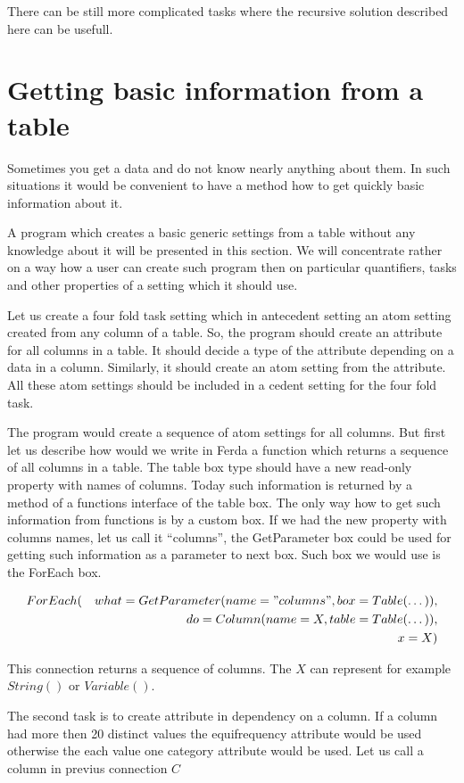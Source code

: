 \documentclass[a4paper,12pt]{book}
\begin{document}
There can be still more complicated tasks where the recursive solution described here can be usefull. 

\section{Getting basic information from a table}
Sometimes you get a data and do not know nearly anything about them. In such situations it would be convenient to have a method how to get quickly basic information about it.

A program which creates a basic generic settings from a table without any knowledge about it will be presented in this section. We will concentrate rather on a way how a user can create such program then on particular quantifiers, tasks and other properties of a setting which it should use.

Let us create a four fold task setting which in antecedent setting an atom setting created from any column of a table. So, the program should create an attribute for all columns in a table. It should decide a type of the attribute depending on a data in a column. Similarly, it should create an atom setting from the attribute. All these atom settings should be included in a cedent setting for the four fold task.

The program would create a sequence of atom settings for all columns. But first let us describe how would we write in Ferda a function which returns a sequence of all columns in a table. The table box type should have a new read-only property with names of columns. Today such information is returned by a method of a functions interface of the table box. The only way how to get such information from functions is by a custom box. If we had the new property with columns names, let us call it ``columns'', the GetParameter box could be used for getting such information as a parameter to next box. Such box we would use is the ForEach box.

\begin{eqnarray*}
ForEach(&&what=GetParameter(name="columns", box=Table(\dots)), \\&& do=Column(name=X, table=Table(\dots)), \\&& x=X)
\end{eqnarray*}

This connection returns a sequence of columns. The $X$ can represent for example $String()$ or $Variable()$.

The second task is to create attribute in dependency on a column. If a column had more then 20 distinct values the equifrequency attribute would be used otherwise the each value one category attribute would be used. Let us call a column in previus connection $C$
\end{document}

